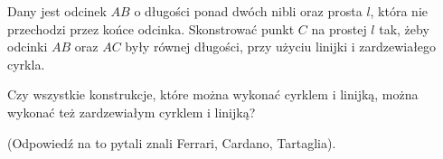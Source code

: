 \begin{geoconstruction}
    Dany jest odcinek $AB$ o długości ponad dwóch nibli oraz prosta $l$, która nie przechodzi przez końce odcinka.
    Skonstrować punkt $C$ na prostej $l$ tak, żeby odcinki $AB$ oraz $AC$ były równej długości, przy użyciu linijki i zardzewiałego cyrkla.
\end{geoconstruction}

\begin{geoconstruction}
\label{broken_ruler_compass_hartshorne_end}%
    Czy wszystkie konstrukcje, które można wykonać cyrklem i linijką, można wykonać też zardzewiałym cyrklem i linijką?
\end{geoconstruction}

(Odpowiedź na to pytali znali Ferrari, Cardano, Tartaglia).

%